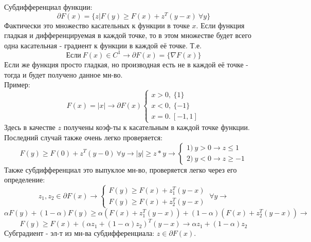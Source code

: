 Субдифференциал функции: 
$$\partial F(x)=\{z|F(y) \geq F(x) + z^T(y-x)~\forall y\}$$
Фактически это множество касательных к функции в точке $x$. Если функция гладкая и дифференцируемая в каждой точке, то в этом множестве будет всего одна касательная - градиент к функции в каждой её точке. Т.е.
$$
\text{Если}~F(x) \in C^1 \to \partial F(x)=\{\nabla F(x)\}
$$
Если же функция просто гладкая, но производная есть не в каждой её точке - тогда и будет получено данное мн-во.\\
Пример:\\
$$
F(x)=|x| \to \partial F(x)\begin{cases}
x > 0,~\{1\}\\
x < 0,~\{-1\}\\
x = 0.~[-1,1]
\end{cases}
$$
Здесь в качестве $z$ получены коэф-ты к касательным в каждой точке функции. Последний случай также очень легко проверяется:
$$
F(y) \geq F(0) + z^T(y-0)~\forall y \to |y| \geq z*y \to \begin{cases}
1)~y>0 \to z \leq 1\\
2)~y < 0 \to z \geq -1
\end{cases}
$$
Также субдифференциал это выпуклое мн-во, проверяется легко через его определение:
$$
z_1,z_2 \in \partial F(x) \to \begin{cases}
F(y) \geq F(x) + z_1^T(y-x)\\
F(y) \geq F(x) + z_2^T(y-x)
\end{cases}~\forall y \to
$$
$$
\alpha F(y) + (1-\alpha) F(y) \geq \alpha(F(x) + z_1^T(y-x)) + (1-\alpha)(F(x) + z_2^T(y-x)) \to
$$
$$
F(y) \geq F(x) + (\alpha z_1 + (1-\alpha)z_2)^T(y-x) \to \alpha z_1 + (1-\alpha)z_2
$$
Субградиент - эл-т из мн-ва субдифференциала: $z \in \partial F(x)$.\\